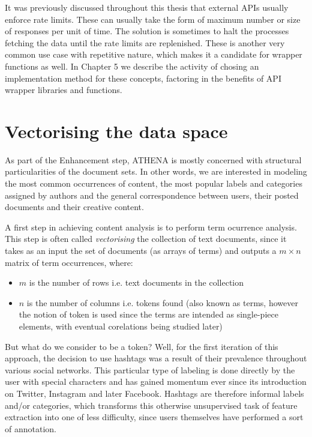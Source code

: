 It was previously discussed throughout this thesis that external APIs usually enforce rate limits. These can usually take the form of maximum number or size of responses per unit of time. The solution is sometimes to halt the processes fetching the data until the rate limits are replenished. These is another very common use case with repetitive nature, which makes it a candidate for wrapper functions as well. In Chapter 5 we describe the activity of chosing an implementation method for these concepts, factoring in the benefits of API wrapper libraries and functions.

\section{Vectorising the data space}
As part of the Enhancement step, ATHENA is mostly concerned with structural particularities of the document sets. In other words, we are interested in modeling the most common occurrences of content, the most popular labels and categories assigned by authors and the general correspondence between users, their posted documents and their creative content.

A first step in achieving content analysis is to perform term ocurrence analysis. This step is often called \emph{vectorising} the collection of text documents, since it takes as an input the set of documents (as arrays of terms) and outputs a $m \times n$ matrix of term occurrences, where:

\begin{itemize}
\item $m$ is the number of rows i.e. text documents in the collection
\item $n$ is the number of columns i.e. tokens found (also known as terms, however the notion of token is used since the terms are intended as single-piece elements, with eventual corelations being studied later)
\end{itemize}

But what do we consider to be a token? Well, for the first iteration of this approach, the decision to use hashtags was a result of their prevalence throughout various social networks. This particular type of labeling is done directly by the user with special characters and has gained momentum ever since its introduction on Twitter, Instagram and later Facebook. Hashtags are therefore informal labels and/or categories, which transforms this otherwise unsupervised task of feature extraction into one of less difficulty, since users themselves have performed a sort of annotation.


